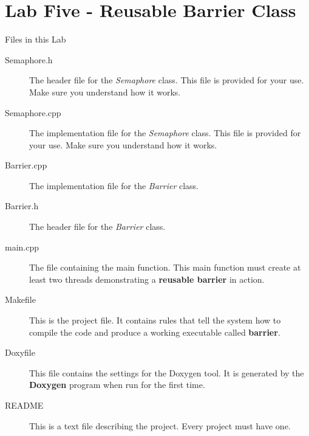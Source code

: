 \documentclass[10pt,a4paper]{article}
\begin{document}
 \section{Lab Five - Reusable Barrier Class}
Files in this Lab
\begin{description}
\item[Semaphore.h] The header file for the \textit{Semaphore} class.  This file is provided for your use.  Make sure you understand how it works.
\item[Semaphore.cpp] The implementation file for the \textit{Semaphore} class.  This file is provided for your use.  Make sure you understand how it works.
    \item[Barrier.cpp] The implementation file for the \textit{Barrier} class.  
    \item[Barrier.h] The header file for the \textit{Barrier} class.
\item[main.cpp] The file containing the main function.  This main function must create at least two threads demonstrating a \textbf{reusable barrier} in action.  
\item[Makefile] This is the project file. It contains rules that tell the system how to compile the code and produce a working executable called \textbf{barrier}. 
\item[Doxyfile] This file contains the settings for the Doxygen tool. It is generated by the \textbf{Doxygen} program when run for the first time.
\item[README] This is a text file describing the project. Every project must have one.
\end{description}
\end{document}
